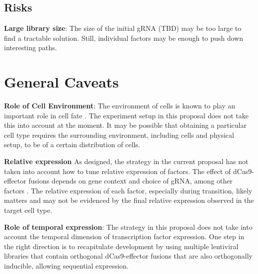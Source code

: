 \documentclass[10pt]{article}
\begin{document}
\subsection{Risks}

\noindent \textbf{Large library size}: The size of the initial gRNA (TBD) may be too large to find a tractable solution. Still, individual factors may be enough to push down interesting paths.

\section*{General Caveats}

\noindent \textbf{Role of Cell Environment}: The environment of cells is known to play an important role in cell fate \cite{drummond2008stem}. The experiment setup in this proposal does not take this into account at the moment. It may be possible that obtaining a particular cell type requires the surrounding environment, including cells and physical setup, to be of a certain distribution of cells.

\noindent \textbf{Relative expression} As designed, the strategy in the current proposal has not taken into account how to tune relative expression of factors. The effect of dCas9-effector fusions depends on gene context and choice of gRNA, among other factors \cite{konermann2014genome, chavez2015VPR}. The relative expression of each factor, especially during transition, likely matters and may not be evidenced by the final relative expression observed in the target cell type.

\noindent \textbf{Role of temporal expression}: The strategy in this proposal does not take into account the temporal dimension of transcription factor expression. One step in the right direction is to recapitulate development by using multiple lentiviral libraries that contain orthogonal dCas9-effector fusions that are also orthogonally inducible, allowing sequential expression.




\end{document}
